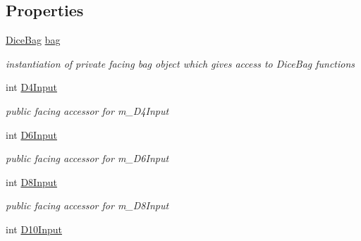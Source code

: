 \subsection*{Properties}
\begin{DoxyCompactItemize}
\item 
\mbox{\hyperlink{class_dungeons__n___dragons___manager_1_1_models_1_1_dice_bag}{Dice\+Bag}} \mbox{\hyperlink{class_dungeons__n___dragons___manager_1_1_viewmodels_1_1_dice_roll_tab_viewmodel_af67f6c8c52f125bae4b965329166a7dd}{bag}}
\begin{DoxyCompactList}\small\item\em instantiation of private facing bag object which gives access to Dice\+Bag functions \end{DoxyCompactList}\item 
int \mbox{\hyperlink{class_dungeons__n___dragons___manager_1_1_viewmodels_1_1_dice_roll_tab_viewmodel_abe198413668cf4e94e03525e8177a321}{D4\+Input}}
\begin{DoxyCompactList}\small\item\em public facing accessor for m\+\_\+\+D4\+Input \end{DoxyCompactList}\item 
int \mbox{\hyperlink{class_dungeons__n___dragons___manager_1_1_viewmodels_1_1_dice_roll_tab_viewmodel_adcce0188b8de96101f5eb350117bbe6f}{D6\+Input}}
\begin{DoxyCompactList}\small\item\em public facing accessor for m\+\_\+\+D6\+Input \end{DoxyCompactList}\item 
int \mbox{\hyperlink{class_dungeons__n___dragons___manager_1_1_viewmodels_1_1_dice_roll_tab_viewmodel_ac5b108d6d0259d48fdf416411242c51b}{D8\+Input}}
\begin{DoxyCompactList}\small\item\em public facing accessor for m\+\_\+\+D8\+Input \end{DoxyCompactList}\item 
int \mbox{\hyperlink{class_dungeons__n___dragons___manager_1_1_viewmodels_1_1_dice_roll_tab_viewmodel_a5af0b02bf6f639f6472b10f5e57009fb}{D10\+Input}}

\end{DoxyCompactItemize}

